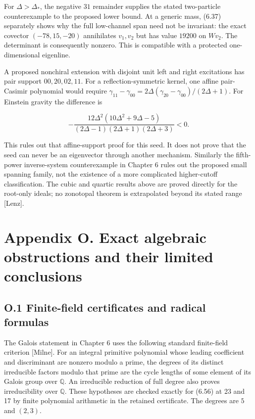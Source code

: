 For \(\Delta>\Delta_*\), the negative \(31\) remainder supplies the stated two-particle counterexample to the proposed lower bound. At a generic mass, (6.37) separately shows why the full low-channel span need not be invariant: the exact covector \((-78,15,-20)\) annihilates \(v_1,v_2\) but has value \(19200\) on \(Wv_2\). The determinant is consequently nonzero. This is compatible with a protected one-dimensional eigenline.

A proposed nonchiral extension with disjoint unit left and right excitations has pair support \(00,20,02,11\). For a reflection-symmetric kernel, one affine pair-Casimir polynomial would require \(\gamma_{11}-\gamma_{00}=2\Delta(\gamma_{20}-\gamma_{00})/(2\Delta+1)\). For Einstein gravity the difference is

\[
-\frac{12\Delta^2(10\Delta^2+9\Delta-5)}{(2\Delta-1)(2\Delta+1)(2\Delta+3)}<0.
\tag{L.26}
\]

This rules out that affine-support proof for this seed. It does not prove that the seed can never be an eigenvector through another mechanism. Similarly the fifth-power inverse-system counterexample in Chapter 6 rules out the proposed small spanning family, not the existence of a more complicated higher-cutoff classification. The cubic and quartic results above are proved directly for the root-only ideals; no zonotopal theorem is extrapolated beyond its stated range {[}Lenz{]}.

\clearpage
\hypertarget{appendix-o.-exact-algebraic-obstructions-and-their-limited-conclusions}{%
\section{Appendix O. Exact algebraic obstructions and their limited conclusions}\label{appendix-o.-exact-algebraic-obstructions-and-their-limited-conclusions}}

\hypertarget{o.1-finite-field-certificates-and-radical-formulas}{%
\subsection{O.1 Finite-field certificates and radical formulas}\label{o.1-finite-field-certificates-and-radical-formulas}}

The Galois statement in Chapter 6 uses the following standard finite-field criterion {[}Milne{]}. For an integral primitive polynomial whose leading coefficient and discriminant are nonzero modulo a prime, the degrees of its distinct irreducible factors modulo that prime are the cycle lengths of some element of its Galois group over \(\mathbb Q\). An irreducible reduction of full degree also proves irreducibility over \(\mathbb Q\). These hypotheses are checked exactly for (6.56) at 23 and 17 by finite polynomial arithmetic in the retained certificate. The degrees are \(5\) and \((2,3)\).

